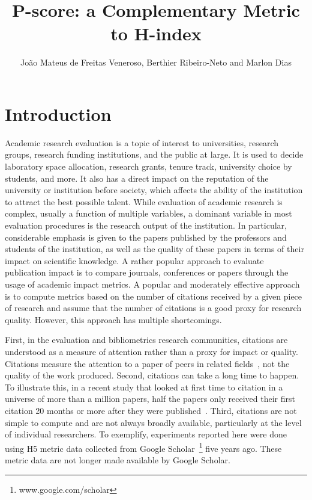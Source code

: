\documentclass[man]{apa6}
\title{P-score: a Complementary Metric to H-index}
\author{João Mateus de Freitas Veneroso, Berthier Ribeiro-Neto and Marlon Dias}
\affiliation{Universidade Federal de Minas Gerais}
\let \cite \parencite
\begin{document}
\setlength{\parindent}{40pt}

\maketitle

\section{Introduction}
\label{sec:introduction}

Academic research evaluation is a topic of interest to universities, research groups,
research funding institutions, and the public at large. It is used to decide laboratory space
allocation, research grants, tenure track, university choice by students, and more. It also 
has a direct impact on the reputation of the university or institution before society, which
affects the ability of the institution to attract the best possible talent. While evaluation of
academic research is complex, usually a function of multiple variables, a dominant variable in
most evaluation procedures is the research output of the institution. In particular, considerable
emphasis is given to the papers published by the professors and students of the institution, as
well as the quality of these papers in terms of their impact on scientific knowledge. A rather
popular approach to evaluate publication impact is to compare journals, conferences or papers
through the usage of academic impact metrics. A popular and moderately effective approach is to
compute metrics based on the number of citations received by a given piece of research and
assume that the number of citations is a good proxy for research quality. However,
this approach has multiple shortcomings. 

First, in the evaluation and bibliometrics research communities, citations are understood
as a measure of attention rather than a proxy for impact or quality. Citations measure 
the attention to a paper of peers in related fields~\cite{Loach2015}, not the quality of the 
work produced. Second, citations can take a long time to happen. To illustrate this, in a recent
study that looked at first time to citation in a universe of more than a million papers, half the 
papers only received their first citation 20 months or more after they were
published~\cite{Nane2012}. Third, citations are not simple to compute and are not always broadly
available, particularly at the level of individual researchers. To exemplify,
experiments reported here were done using H5 metric data collected from Google 
Scholar~\footnote{www.google.com/scholar} five years ago. These metric data are not longer 
made available by Google Scholar.
\end{document}

